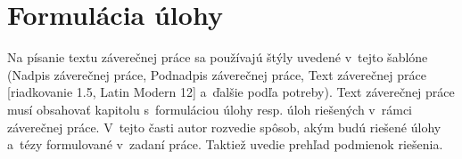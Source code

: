 \section{Formulácia úlohy}
Na písanie textu záverečnej práce sa používajú štýly uvedené v~tejto
šablóne (Nadpis záverečnej práce, Podnadpis záverečnej práce, Text
záverečnej práce [riadkovanie 1.5, Latin Modern %
12] a~ďalšie podľa
potreby). Text záverečnej práce musí obsahovať kapitolu s~formuláciou
úlohy resp. úloh riešených v~rámci záverečnej práce. V~tejto časti
autor rozvedie spôsob, akým budú riešené úlohy a~tézy formulované
v~zadaní práce. Taktiež uvedie prehľad podmienok riešenia.